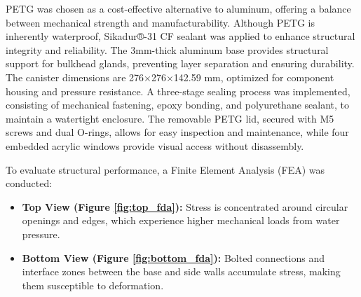 \hspace{10pt} PETG was chosen as a cost-effective alternative to aluminum, offering a balance between mechanical strength and manufacturability. Although PETG is inherently waterproof, Sikadur®-31 CF sealant was applied to enhance structural integrity and reliability. The 3mm-thick aluminum base provides structural support for bulkhead glands, preventing layer separation and ensuring durability. The canister dimensions are 276×276×142.59 mm, optimized for component housing and pressure resistance. A three-stage sealing process was implemented, consisting of mechanical fastening, epoxy bonding, and polyurethane sealant, to maintain a watertight enclosure. The removable PETG lid, secured with M5 screws and dual O-rings, allows for easy inspection and maintenance, while four embedded acrylic windows provide visual access without disassembly.

\hspace{10pt} To evaluate structural performance, a Finite Element Analysis (FEA) was conducted:

\vspace{-0.5\baselineskip}
\begin{itemize}
    \setlength{\itemsep}{0pt}
    \item \textbf{Top View (Figure \ref{fig:top_fda}):} Stress is concentrated around circular openings and edges, which experience higher mechanical loads from water pressure.
    \item \textbf{Bottom View (Figure \ref{fig:bottom_fda}):} Bolted connections and interface zones between the base and side walls accumulate stress, making them susceptible to deformation.
\end{itemize}

